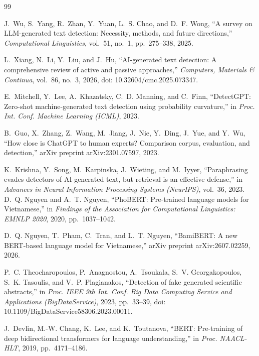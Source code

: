 \documentclass[conference,a4paper]{IEEEtran}
\begin{document}
\begin{thebibliography}{99}

J.~Wu, S.~Yang, R.~Zhan, Y.~Yuan, L.~S. Chao, and D.~F. Wong, ``A survey on LLM-generated text detection: Necessity, methods, and future directions,'' \emph{Computational Linguistics}, vol.~51, no.~1, pp.~275--338, 2025.

L.~Xiang, N.~Li, Y.~Liu, and J.~Hu, ``AI-generated text detection: A comprehensive review of active and passive approaches,'' \emph{Computers, Materials \& Continua}, vol.~86, no.~3, 2026, doi: 10.32604/cmc.2025.073347.

E.~Mitchell, Y.~Lee, A.~Khazatsky, C.~D. Manning, and C.~Finn, ``DetectGPT: Zero-shot machine-generated text detection using probability curvature,'' in \emph{Proc. Int. Conf. Machine Learning (ICML)}, 2023.

B.~Guo, X.~Zhang, Z.~Wang, M.~Jiang, J.~Nie, Y.~Ding, J.~Yue, and Y.~Wu, ``How close is ChatGPT to human experts? Comparison corpus, evaluation, and detection,'' arXiv preprint arXiv:2301.07597, 2023.

K.~Krishna, Y.~Song, M.~Karpinska, J.~Wieting, and M.~Iyyer, ``Paraphrasing evades detectors of AI-generated text, but retrieval is an effective defense,'' in \emph{Advances in Neural Information Processing Systems (NeurIPS)}, vol.~36, 2023.
D.~Q. Nguyen and A.~T. Nguyen, ``PhoBERT: Pre-trained language models for Vietnamese,'' in \emph{Findings of the Association for Computational Linguistics: EMNLP 2020}, 2020, pp.~1037--1042.

D.~Q. Nguyen, T.~Pham, C.~Tran, and L.~T. Nguyen, ``BamiBERT: A new BERT-based language model for Vietnamese,'' arXiv preprint arXiv:2607.02259, 2026.

P.~C. Theocharopoulos, P.~Anagnostou, A.~Tsoukala, S.~V. Georgakopoulos, S.~K. Tasoulis, and V.~P. Plagianakos, ``Detection of fake generated scientific abstracts,'' in \emph{Proc. IEEE 9th Int. Conf. Big Data Computing Service and Applications (BigDataService)}, 2023, pp.~33--39, doi: 10.1109/BigDataService58306.2023.00011.

J.~Devlin, M.-W. Chang, K.~Lee, and K.~Toutanova, ``BERT: Pre-training of deep bidirectional transformers for language understanding,'' in \emph{Proc. NAACL-HLT}, 2019, pp.~4171--4186.


\end{thebibliography}
\end{document}

